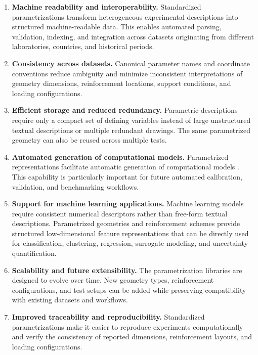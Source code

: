 \documentclass[11pt]{book}
\begin{document}
\begin{enumerate}

\item \textbf{Machine readability and interoperability.} Standardized parametrizations transform heterogeneous experimental descriptions into structured machine-readable data. This enables automated parsing, validation, indexing, and integration across datasets originating from different laboratories, countries, and historical periods.

\item \textbf{Consistency across datasets.} Canonical parameter names and coordinate conventions reduce ambiguity and minimize inconsistent interpretations of geometry dimensions, reinforcement locations, support conditions, and loading configurations.

\item \textbf{Efficient storage and reduced redundancy.} Parametric descriptions require only a compact set of defining variables instead of large unstructured textual descriptions or multiple redundant drawings. The same parametrized geometry can also be reused across multiple tests.

\item \textbf{Automated generation of computational models.} Parametrized representations facilitate automatic generation of computational models . This capability is particularly important for future automated calibration, validation, and benchmarking workflows.

\item \textbf{Support for machine learning applications.} Machine learning models require consistent numerical descriptors rather than free-form textual descriptions. Parametrized geometries and reinforcement schemes provide structured low-dimensional feature representations that can be directly used for classification, clustering, regression, surrogate modeling, and uncertainty quantification.

\item \textbf{Scalability and future extensibility.} The parametrization libraries are designed to evolve over time. New geometry types, reinforcement configurations, and test setups can be added while preserving compatibility with existing datasets and workflows.

\item \textbf{Improved traceability and reproducibility.} Standardized parametrizations make it easier to reproduce experiments computationally and verify the consistency of reported dimensions, reinforcement layouts, and loading configurations.

\end{enumerate}
\end{document}
